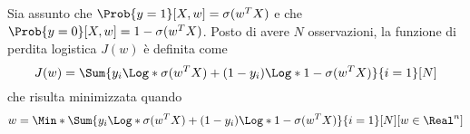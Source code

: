 \documentclass{subfiles}
\begin{document}
Sia assunto che \(\Prob{y = 1}[X, w] = \sigma(w^{T}X)\) e che \(\Prob{y = 0}[X, w] = 1 - \sigma(w^{T}X)\).
Posto di avere \(N\) osservazioni, la funzione di perdita logistica \(J(w)\) è definita come
\[
    J(w) = \Sum{y_{i} \Log*{\sigma(w^{T}X)} + (1 - y_{i}) \Log*{1 - \sigma(w^{T}X)}}{i = 1}[N]
\]
che risulta minimizzata quando
\[
    w = \Min*{\Sum{y_{i} \Log*{\sigma(w^{T}X)} + (1 - y_{i}) \Log*{1 - \sigma(w^{T}X)}}{i = 1}[N]}[w \in \Real^{n}]
\]
\end{document}

